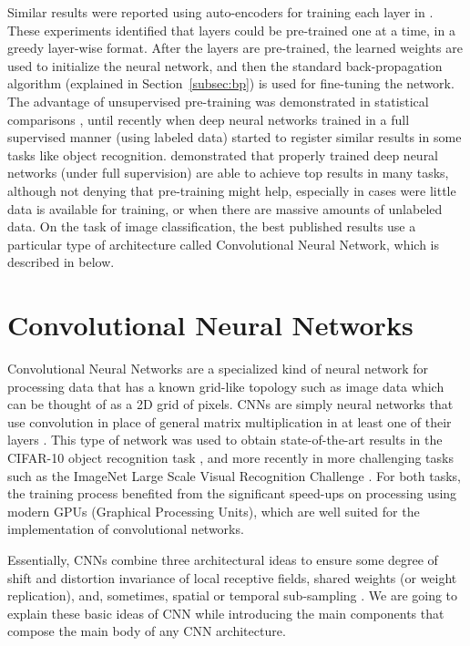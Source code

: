 \indent Similar results were reported using auto-encoders for training each layer in \cite{bengio2007greedy}. These experiments identified that layers could be pre-trained one at a time, in a greedy layer-wise format. After the layers are pre-trained, the learned weights are used to initialize the neural network, and then the standard back-propagation algorithm (explained in Section~\ref{subsec:bp}) is used for fine-tuning the network. The advantage of unsupervised pre-training was demonstrated in statistical comparisons \cite{bengio2007greedy}, until recently when deep neural networks trained in a full supervised manner (using labeled data) started to register similar results in some tasks like object recognition. \citet{ciresan2012multi} demonstrated that properly trained deep neural networks (under full supervision) are able to achieve top results in many tasks, although not denying that pre-training might help, especially in cases were little data is available for training, or when there are massive amounts of unlabeled data. On the task of image classification, the best published results use a particular type of architecture called Convolutional Neural Network, which is described in below.



\section{Convolutional Neural Networks}
\label{sec:cnn}
Convolutional Neural Networks are a specialized kind of neural network for processing data that has a known grid-like topology such as image data which can be thought of as a 2D grid of pixels. CNNs are simply neural networks that use convolution in place of general matrix multiplication in at least one of their layers \cite{Goodfellow-et-al-2016-Book}. This type of network was used to obtain state-of-the-art results in the CIFAR-10 object recognition task \cite{ciresan2012multi}, and more recently in more challenging tasks such as the ImageNet Large Scale Visual Recognition Challenge \cite{russakovsky2015imagenet}. For both tasks, the training process benefited from the significant speed-ups on processing using modern GPUs (Graphical Processing Units), which are well suited for the implementation of convolutional networks.


Essentially, CNNs combine three architectural ideas to ensure some degree of shift and distortion invariance of local receptive fields, shared weights (or weight replication), and, sometimes, spatial or temporal sub-sampling \cite{lecun2010convolutional}. We are going to explain these basic ideas of CNN while introducing the main components that compose the main body of any CNN architecture.

